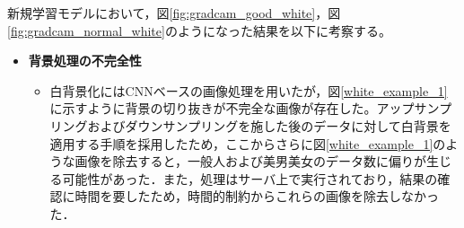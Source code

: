 \documentclass[a4paper,11pt,titlepage]{jsarticle}
\begin{document}
新規学習モデルにおいて，図\ref{fig:gradcam_good_white}，図\ref{fig:gradcam_normal_white}のようになった結果を以下に考察する。
\begin{itemize}
  \item \textbf{背景処理の不完全性}
    \begin{itemize}
      \item 白背景化にはCNNベースの画像処理を用いたが，図\ref{white_example_1}に示すように背景の切り抜きが不完全な画像が存在した。アップサンプリングおよびダウンサンプリングを施した後のデータに対して白背景を適用する手順を採用したため，ここからさらに図\ref{white_example_1}のような画像を除去すると，一般人および美男美女のデータ数に偏りが生じる可能性があった．また，処理はサーバ上で実行されており，結果の確認に時間を要したため，時間的制約からこれらの画像を除去しなかった．
    \end{itemize}


\end{itemize}
\end{document}
